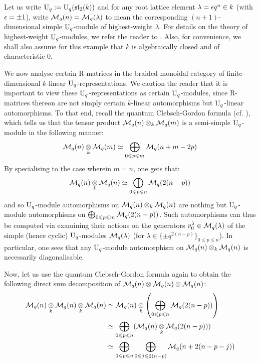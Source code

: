         \begin{example}
            Let us write $\mathrm{U}_q := \mathrm{U}_q(\mathfrak{sl}_2(k))$ and for any root lattice element $\lambda = \epsilon q^n\in k$ (with $\epsilon = \pm 1$), write $\mathcal{M}_q(n) = \mathcal{M}_q(\lambda)$ to mean the corresponding $(n + 1)$-dimensional simple $\mathrm{U}_q$-module of highest-weight $\lambda$. For details on the theory of highest-weight $\mathrm{U}_q$-modules, we refer the reader to \cite[Chapters VI and VII]{kassel_quantum_groups}. Also, for convenience, we shall also assume for this example that $k$ is algebraically closed and of characteristic $0$. 
            
            We now analyse certain R-matrices in the braided monoidal category of finite-dimensional $k$-linear $\mathrm{U}_q$-representations. We caution the reader that it is important to view these $\mathrm{U}_q$-representations as certain $\mathrm{U}_q$-modules, since R-matrices thereon are not simply certain $k$-linear automorphisms but $\mathrm{U}_q$-linear automorphisms. To that end, recall the quantum Clebsch-Gordon formula (cf. \cite[Theorem VII.7.1]{kassel_quantum_groups}), which tells us that the tensor product $\simple_q(n) \tensor_k \simple_q(m)$ is a semi-simple $\mathrm{U}_q$-module in the following manner:
                $$\simple_q(n) \tensor_k \simple_q(m) \cong \bigoplus_{0 \leq p \leq m} \simple_q(n + m - 2p)$$
            By specialising to the case wherein $m = n$, one gets that:
                $$\simple_q(n) \tensor_k \simple_q(n) \cong \bigoplus_{0 \leq p \leq n} \simple_q(2(n - p))$$
            and so $\mathrm{U}_q$-module automorphisms on $\simple_q(n) \tensor_k \simple_q(n)$ are nothing but $\mathrm{U}_q$-module automorphisms on $\bigoplus_{0 \leqslant p \leqslant m} \mathcal{M}_q(2(n - p))$. Such automorphisms can thus be computed via examining their actions on the generators $v^{\lambda}_0 \in \mathcal{M}_q(\lambda)$ of the simple (hence cyclic) $\mathrm{U}_q$-modules $\mathcal{M}_q(\lambda)$ (for $\lambda \in \{\pm q^{ 2(n - p) }\}_{0 \leq p \leq n}$). In particular, one sees that any $\mathrm{U}_q$-module automorphism on $\simple_q(n) \tensor_k \simple_q(n)$ is necessarily diagonalisable. 
            
            Now, let us use the quantum Clebsch-Gordon formula again to obtain the following direct sum decomposition of $\simple_q(n) \tensor \simple_q(n) \tensor \simple_q(n)$:
                $$
                    \begin{aligned}
                        \simple_q(n) \tensor_k \simple_q(n) \tensor_k \simple_q(n) & \cong \simple_q(n) \tensor_k \left( \bigoplus_{0 \leq p \leq n} \simple_q(2(n - p)) \right)
                        \\
                        & \cong \bigoplus_{0 \leq p \leq n} ( \simple_q(n) \tensor_k \simple_q(2(n - p)) )
                        \\
                        & \cong \bigoplus_{0 \leq p \leq n} \bigoplus_{0 \leq j \leq 2(n - p)} \simple_q(n + 2(n - p - j))
                    \end{aligned}
                $$
        \end{example}